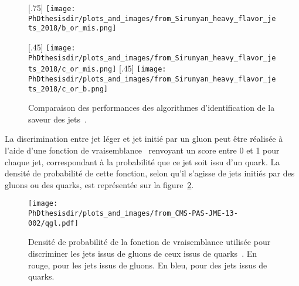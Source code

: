 \begin{figure}[h]
\centering

[.75\textwidth]
{\texttt{[image: \\PhDthesisdir/plots\_and\_images/from\_Sirunyan\_heavy\_flavor\_jets\_2018/b\_or\_mis.png]}}

\vspace{\baselineskip}

[.45\textwidth]
{\texttt{[image: \\PhDthesisdir/plots\_and\_images/from\_Sirunyan\_heavy\_flavor\_jets\_2018/c\_or\_mis.png]}}
\hfill
{}[.45\textwidth]
{\texttt{[image: \\PhDthesisdir/plots\_and\_images/from\_Sirunyan\_heavy\_flavor\_jets\_2018/c\_or\_b.png]}}

\caption[Performances des algorithmes d'identification de la saveur des jets.]{Comparaison des performances des algorithmes d'identification de la saveur des jets~\cite{Sirunyan_heavy_flavor_jets_2018}.}
\label{fig-chapter-JERC-section-jets_reco-subsec-flavor-bc_tag_roc_curves}
\end{figure}
\par La discrimination entre jet léger et jet initié par un gluon peut être réalisée à l'aide d'une fonction de vraisemblance~\cite{CMS-PAS-JME-13-002} renvoyant un score entre 0 et 1 pour chaque jet, correspondant à la probabilité que ce jet soit issu d'un quark. La densité de probabilité de cette fonction, selon qu'il s'agisse de jets initiés par des gluons ou des quarks, est représentée sur la figure~\ref{fig-chapter-JERC-section-jets_reco-subsec-flavor-qgl_likelihood}.
\begin{figure}[h]
\centering
\texttt{[image: \\PhDthesisdir/plots\_and\_images/from\_CMS-PAS-JME-13-002/qgl.pdf]}
\caption[Performances de la discrimation quark-gluon pour la saveur des jets.]{Densité de probabilité de la fonction de vraisemblance utilisée pour discriminer les jets issus de gluons de ceux issus de quarks~\cite{CMS-PAS-JME-13-002}. En rouge, pour les jets issus de gluons. En bleu, pour des jets issus de quarks.}
\label{fig-chapter-JERC-section-jets_reco-subsec-flavor-qgl_likelihood}
\end{figure}
